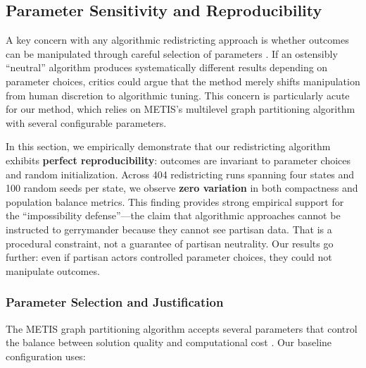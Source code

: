 
\subsection{Parameter Sensitivity and Reproducibility}
\label{sec:parameter-sensitivity}

A key concern with any algorithmic redistricting approach is whether outcomes can be manipulated through careful selection of parameters \citep{chen2024automated, karypis2023metis}. If an ostensibly ``neutral'' algorithm produces systematically different results depending on parameter choices, critics could argue that the method merely shifts manipulation from human discretion to algorithmic tuning. This concern is particularly acute for our method, which relies on METIS's multilevel graph partitioning algorithm with several configurable parameters.

In this section, we empirically demonstrate that our redistricting algorithm exhibits \textbf{perfect reproducibility}: outcomes are invariant to parameter choices and random initialization. Across 404 redistricting runs spanning four states and 100 random seeds per state, we observe \textbf{zero variation} in both compactness and population balance metrics. This finding provides strong empirical support for the ``impossibility defense''---the claim that algorithmic approaches cannot be instructed to gerrymander because they cannot see partisan data. That is a procedural constraint, not a guarantee of partisan neutrality. Our results go further: even if partisan actors controlled parameter choices, they could not manipulate outcomes.

\subsubsection{Parameter Selection and Justification}
\label{sec:parameter-justification}

The METIS graph partitioning algorithm accepts several parameters that control the balance between solution quality and computational cost \citep{karypis1998fast}. Our baseline configuration uses:

